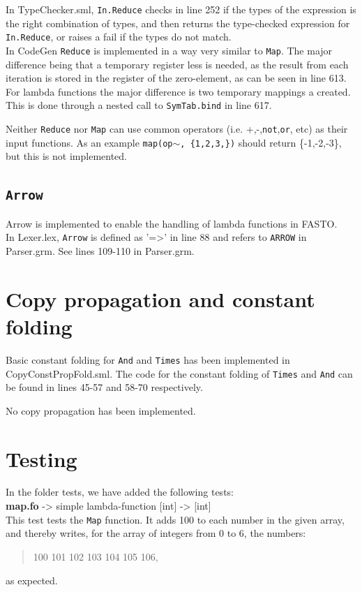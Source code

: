 \documentclass[11pt,a4paper]{article}
\theoremstyle{plain}
\theoremstyle{definition}
\theoremstyle{remark}
\numberwithin{equation}{section}
\begin{document}
	In TypeChecker.sml, \texttt{In.Reduce} checks in line 252 if the types of the expression is the right combination of types, and then returns the type-checked expression for \texttt{In.Reduce}, or raises a fail if the types do not match.\\
	
	
	In CodeGen \texttt{Reduce} is implemented in a way very similar to \texttt{Map}. The major difference being that a temporary register less is needed, as the result from each iteration is stored in the register of the zero-element, as can be seen in line 613. For lambda functions the major difference is two temporary mappings a created. This is done through a nested call to \texttt{SymTab.bind} in line 617.
	
	Neither \texttt{Reduce} nor \texttt{Map} can use common operators (i.e. +,-,\texttt{not},\texttt{or}, etc) as their input functions. As an example \texttt{map(op$\sim$, \{1,2,3,\})} should return \{-1,-2,-3\}, but this is not implemented.
	
	\subsection{\texttt{Arrow}}
	Arrow is implemented to enable the handling of lambda functions in FASTO.\\
	In Lexer.lex, \texttt{Arrow} is defined as '=>' in line 88 and refers to \texttt{ARROW} in Parser.grm. See lines 109-110 in Parser.grm.\\
	
	
	\section{Copy propagation and constant folding}
	Basic constant folding for \texttt{And} and \texttt{Times} has been implemented in CopyConstPropFold.sml. The code for the constant folding of \texttt{Times} and \texttt{And} can be found in lines 45-57 and 58-70 respectively.
	
	No copy propagation has been implemented.
	
	
	\section{Testing}
	In the folder tests, we have added the following tests:\\
	\textbf{map.fo} -> simple lambda-function [int] -> [int]\\
	This test tests the \texttt{Map} function. It adds 100 to each number in the given array, and thereby writes, for the array of integers from 0 to 6, the numbers:
	\begin{quote}
		100 101 102 103 104 105 106,
	\end{quote}
	as expected.\\
	
\end{document}
